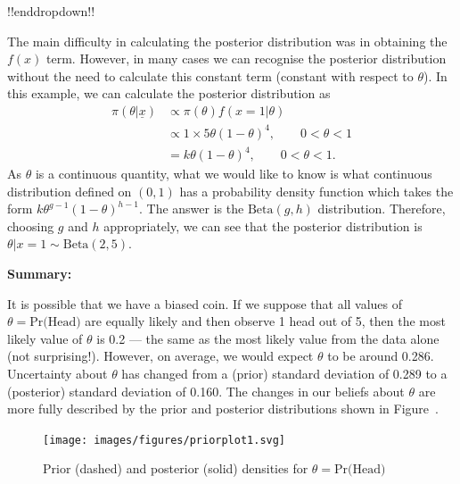 {!!enddropdown!!











The main difficulty in calculating the posterior distribution was in obtaining the $f(x)$ term. However, in many cases we can recognise the posterior distribution without the need to calculate this constant term (constant with respect to $\theta$). In this example, we can calculate the posterior distribution as
\begin{align*}
\pi(\theta|\underline{x})&\propto\pi(\theta)f(x=1|\theta) \\
&\propto 1\times 5\theta(1-\theta)^4,\quad\quad 0<\theta<1  \\
&=k\theta(1-\theta)^4,\quad\quad 0<\theta<1.
\end{align*}
As $\theta$ is a continuous quantity, what we would like to know is what continuous distribution defined on $(0,1)$ has a probability density function which takes the form $k\theta^{g-1}(1-\theta)^{h-1}$. The answer is the $\mathrm{Beta}(g,h)$ distribution. Therefore, choosing $g$ and $h$ appropriately, we can see that the posterior distribution is $\theta|x=1\sim \mathrm{Beta}(2,5)$.

\textbf{Summary:}

It is possible that we have a biased coin. If we suppose that all values of $\theta=\text{Pr(Head)}$ are equally likely and then observe 1 head out of 5, then the most likely value of $\theta$ is 0.2 --- the same as the most likely value from the data alone (not surprising!). However, on average, we would expect $\theta$ to be around 0.286. Uncertainty about $\theta$ has changed from a (prior) standard deviation of 0.289 to a (posterior) standard deviation of 0.160. The changes in our beliefs about $\theta$ are more fully described by the prior and posterior distributions shown in Figure~.
\begin{figure}[ht]

\texttt{[image: images/figures/priorplot1.svg]}
\caption{Prior (dashed) and posterior (solid) densities for $\theta=\text{Pr(Head)}$}


\end{figure}}

